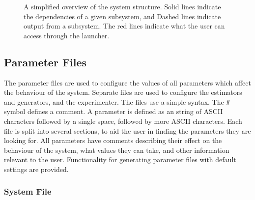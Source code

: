 \documentclass[a4paper,11pt]{article}
\begin{document}
\begin{figure}
   \caption{A simplified overview of the system structure. Solid lines indicate
   the dependencies of a given subsystem, and Dashed lines indicate output from a
   subsystem. The red lines indicate what the user can access through the launcher.}
   \label{fig:sysstruct}
   \end{figure}
\subsection{Parameter Files}
\label{sec-6-2}

   The parameter files are used to configure the values of all parameters which
   affect the behaviour of the system. Separate files are used to configure the
   estimators and generators, and the experimenter. The files use a simple
   syntax. The \texttt{\#} symbol defines a comment. A parameter is defined as
   an string of ASCII characters followed by a single space, followed by more
   ASCII characters. Each file is split into several sections, to aid the user
   in finding the parameters they are looking for. All parameters have comments
   describing their effect on the behaviour of the system, what values they can
   take, and other information relevant to the user. Functionality for
   generating parameter files with default settings are provided.
\subsubsection{System File}
\label{sec-6-2-1}
\end{document}
